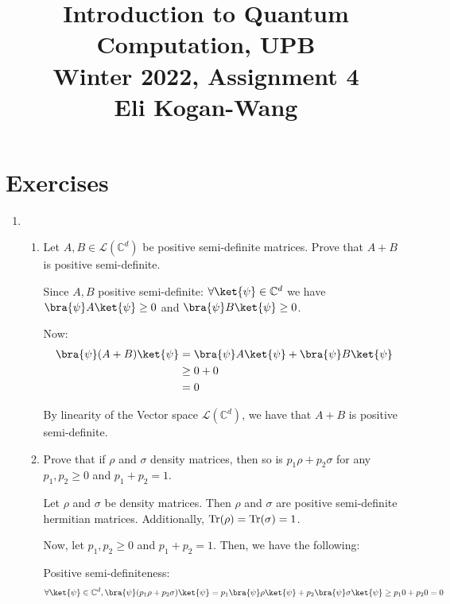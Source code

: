 \documentclass{article}
\newcommand{\trace}{{\rm Tr}}
\newcommand{\complex}{{\mathbb C}}
\newcommand{\LL}{\mathcal{L}}
\begin{document}
\title{\vspace{-10mm}Introduction to Quantum Computation, UPB\\Winter 2022, Assignment 4\\{\large Eli Kogan-Wang}}
\date{}
\maketitle

\section{Exercises}
\begin{enumerate}
  \item
        \begin{enumerate}
          \item  Let $A,B\in\LL(\complex^d)$ be positive semi-definite matrices. Prove that $A+B$ is positive semi-definite.

                Since $A,B$ positive semi-definite: $\forall \ket{\psi}\in\complex^d$ we have $\bra{\psi}A\ket{\psi}\geq 0$ and $\bra{\psi}B\ket{\psi}\geq 0$.

                Now: $$\begin{aligned}
                    \bra{\psi}(A+B)\ket{\psi} & = \bra{\psi}A\ket{\psi} + \bra{\psi}B\ket{\psi} \\
                                              & \geq 0 + 0                                      \\
                                              & = 0
                  \end{aligned}$$

                By linearity of the Vector space $\LL(\complex^d)$, we have that $A+B$ is positive semi-definite.

          \item  Prove that if $\rho$ and $\sigma $ density matrices, then so is $p_1\rho+p_2\sigma$ for any $p_1,p_2\geq 0$ and $p_1+p_2=1$.

                Let $\rho$ and $\sigma$ be density matrices. Then $\rho$ and $\sigma$ are positive semi-definite hermitian matrices.
                Additionally, $\trace(\rho)=\trace(\sigma)=1$.

                Now, let $p_1,p_2\geq 0$ and $p_1+p_2=1$. Then, we have the following:

                Positive semi-definiteness:
                $$\forall \ket{\psi}\in\complex^d,
                  \bra{\psi}(p_1\rho+p_2\sigma)\ket{\psi}
                  =p_1\bra{\psi}\rho\ket{\psi}+p_2\bra{\psi}\sigma\ket{\psi}\geq p_10+p_20=0$$


\end{enumerate}
\end{enumerate}
\end{document}
